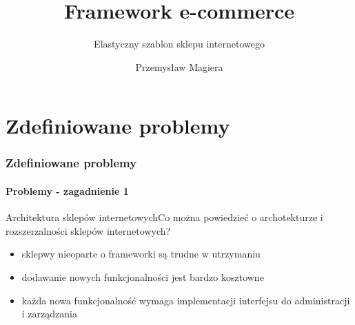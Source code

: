 \documentclass[polish,xcolor=table,9pt,aspectratio=1610,hyperref={pdfpagemode=FullScreen}]{beamer}
\title{Framework e-commerce}
\subtitle{Elastyczny szablon sklepu internetowego}
\author{Przemysław Magiera}
\begin{document}
\frame{\titlepage}

\part{Zdefiniowane problemy} %
\section{Zdefiniowane problemy}
%

\subsection{Problemy - zagadnienie 1}

\begin{frame}{Architektura sklepów internetowych}{Co można powiedzieć o archotekturze i rozszerzalności sklepów internetowych?}
\begin{itemize}
\item<1-> sklepwy nieoparte o frameworki są trudne w utrzymaniu %
\item<1-> dodawanie nowych funkcjonalności jest bardzo kosztowne  %
\item<1-> każda nowa funkcjonalność wymaga implementacji interfejsu do administracji i zarządzania
\end{itemize}
\end{frame}
\end{document}
